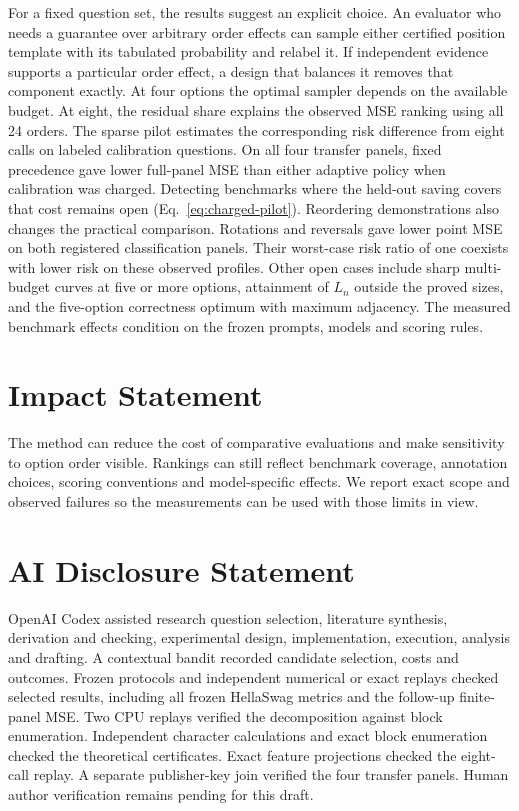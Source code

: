 \documentclass{article}
\begin{document}
For a fixed question set, the results suggest an explicit choice.
An evaluator who needs a guarantee over arbitrary order effects can
sample either certified position template with its tabulated probability
and relabel it. If independent evidence supports a particular order
effect, a design that balances it removes that component exactly. At four options the optimal sampler depends on the available
budget. At eight, the residual share explains the observed MSE ranking
using all 24 orders. The sparse pilot estimates the corresponding
risk difference from eight calls on labeled calibration questions.
On all four transfer panels, fixed precedence gave lower full-panel
MSE than either adaptive policy when calibration was charged. Detecting
benchmarks where the held-out saving covers that cost remains open
(Eq.~\eqref{eq:charged-pilot}). Reordering demonstrations also changes the practical comparison. Rotations and reversals gave lower point MSE on both registered classification panels. Their worst-case risk ratio of one coexists with lower risk on these observed profiles. Other open
cases include sharp multi-budget
curves at five or more options, attainment of $L_n$ outside the proved sizes, and the
five-option correctness optimum with maximum adjacency. The measured benchmark effects condition on the frozen
prompts, models and scoring rules.

\section*{Impact Statement}
The method can reduce the cost of comparative evaluations and make
sensitivity to option order visible. Rankings can still reflect
benchmark coverage, annotation choices, scoring conventions and
model-specific effects. We report exact scope and observed failures
so the measurements can be used with those limits in view.

\section*{AI Disclosure Statement}
OpenAI Codex assisted research question selection, literature
synthesis, derivation and checking, experimental design, implementation,
execution, analysis and drafting. A contextual bandit recorded candidate
selection, costs and outcomes. Frozen protocols and independent
numerical or exact replays checked selected results, including all frozen
HellaSwag metrics and the follow-up finite-panel MSE. Two CPU replays
verified the decomposition against block enumeration. Independent character calculations and exact block enumeration checked the theoretical certificates. Exact feature projections checked the eight-call replay. A separate publisher-key join verified the four transfer panels. Human author
verification remains pending for this draft.



\clearpage
\appendix
\onecolumn

\end{document}
